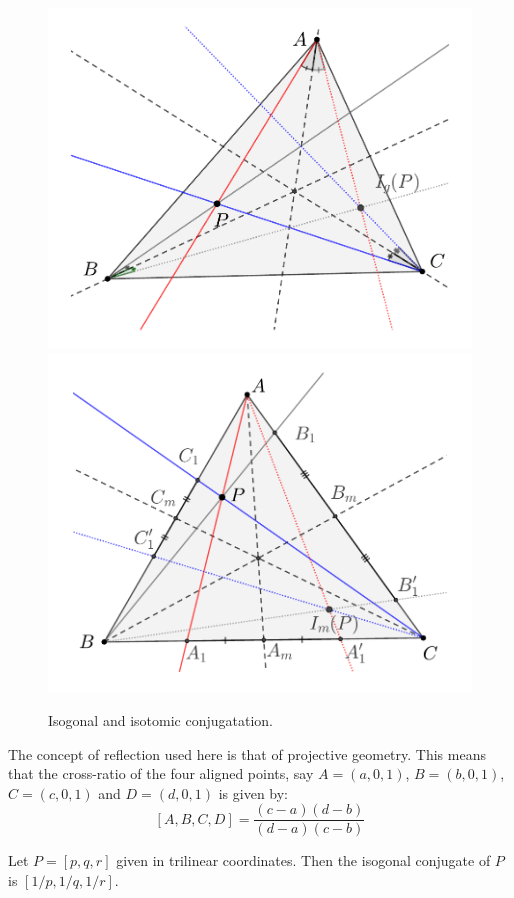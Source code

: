 \begin{figure}
\centering
	    \includegraphics[scale=0.35]{zappA/pics/pics-appA_180-isogonal.pdf}
	     \includegraphics[scale=0.4]{zappA/pics/pics-appA_190-isotomic.pdf}
	    \caption{Isogonal and isotomic conjugatation.}
	    \label{fig:appA-isotomic-isogonal}
	\end{figure}

	 \begin{remark}
 The concept of reflection used here is that of projective geometry. This means that the cross-ratio of the four aligned points, say $A=( a,0,1)$, $B=(b,0,1)$, $C=(c,0,1)$ and $D=(d,0,1)$ is given by:
 \[ [A,B,C,D]=\frac{(c-a)(d-b)}{(d-a)(c-b)}\]
 \end{remark}
	\begin{proposition}
	Let $P=[p,q,r]$ given in trilinear coordinates. Then the isogonal conjugate of $P$ is $[1/p,1/q,1/r]$.
	\end{proposition}
	
